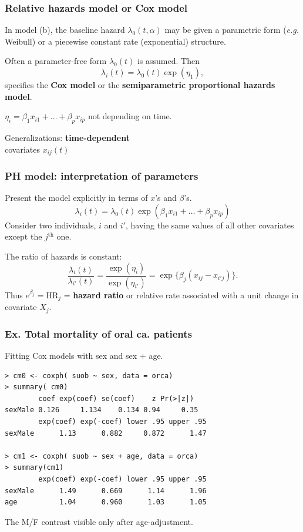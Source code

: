 \documentclass[handout,12pt,dvipsnames,t]{beamer}
\begin{document}
\begin{frame}
\frametitle{Relative hazards model or Cox model}

In model (b), the baseline hazard $\lambda_0(t,\alpha)$ may be given a parametric form (\textit{e.g.} Weibull) or
a piecewise constant rate (exponential) structure.

\bigskip
Often a parameter-free form $\lambda_0(t)$ is assumed. Then
\[
  \lambda_i(t) = \lambda_0(t) \exp(\eta_1),
\]
specifies the \textbf{Cox model} or the \textbf{semiparametric proportional hazards model}.

\bigskip
$\eta_i = \beta_1 x_{i1} + \dots + \beta_p x_{ip}$ not depending on time.  

\bigskip
Generalizations: \textbf{time-dependent} \\ covariates $x_{ij}(t)$



\end{frame}


\begin{frame}
\frametitle{PH model: interpretation of parameters}

Present the model explicitly in terms of $x$'s and $\beta$'s.
\[
\lambda_i(t) = \lambda_0(t)  \exp({\beta_1 x_{i1} + \dots +
\beta_p x_{ip}})
\]
Consider two individuals, $i$ and $i'$, having the same values of all
other covariates except the $j^{\text{th}}$ one.

\bigskip
The ratio of hazards is constant:
$$  \frac{\lambda_i(t)}{\lambda_{i'}(t)} = \frac{\exp( \eta_{i}) }{\exp(\eta_{i'})}
= \exp \{ \beta_j(x_{ij}-x_{i'j}) \} . $$
Thus $e^{\beta_j} = \text{HR}_j$ = \textbf{hazard ratio} or relative rate
 associated with
 a unit change in covariate $X_j$.

\end{frame}

\begin{frame}[fragile]
\frametitle{Ex. Total mortality of oral ca. patients}

Fitting Cox models with sex and sex + age.
\small
\begin{verbatim}
> cm0 <- coxph( suob ~ sex, data = orca)
> summary( cm0)
        coef exp(coef) se(coef)    z Pr(>|z|)
sexMale 0.126     1.134    0.134 0.94     0.35
        exp(coef) exp(-coef) lower .95 upper .95
sexMale      1.13      0.882     0.872      1.47

> cm1 <- coxph( suob ~ sex + age, data = orca)
> summary(cm1)
        exp(coef) exp(-coef) lower .95 upper .95
sexMale      1.49      0.669      1.14      1.96
age          1.04      0.960      1.03      1.05
\end{verbatim}
\normalsize
The M/F contrast visible only after age-adjustment.
\end{frame}
\end{document}
